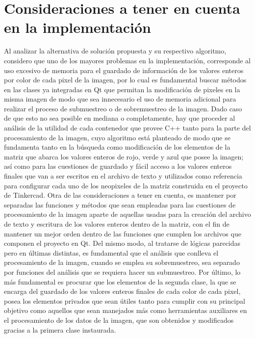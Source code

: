\documentclass{article}
\begin{document}
 \section{Consideraciones a tener en cuenta en la implementación}
 Al analizar la alternativa de solución propuesta y su respectivo algoritmo, considero que uno de los mayores problemas en la implementación, corresponde al uso excesivo de memoria para el guardado de información de los valores enteros por color de cada pixel de la imagen, por lo cual es fundamental buscar métodos en las clases ya integradas en Qt que permitan la modificación de pixeles en la misma imagen de modo que sea innecesario el uso de memoria adicional para realizar el proceso de submuestreo o de sobremuestreo de la imagen. Dado caso de que esto no sea posible en mediana o completamente, hay que proceder al análisis de la utilidad de cada contenedor que provee C++ tanto para la parte del procesamiento de la imagen, cuyo algoritmo está planteado de modo que se fundamenta tanto en la búsqueda como modificación de los elementos de la matriz que abarca los valores enteros de rojo, verde y azul que posee la imagen; así como para las cuestiones de guardado y fácil acceso a los valores enteros finales que van a ser escritos en el archivo de texto y utilizados como referencia para configurar cada uno de los neopixeles de la matriz construida en el proyecto de Tinkercad. Otra de las consideraciones a tener en cuenta, es mantener por separadas las funciones y métodos que sean empleadas para las cuestiones de procesamiento de la imagen aparte de aquellas usadas para la creación del archivo de texto y escritura de los valores enteros dentro de la matriz, con el fin de mantener un mejor orden dentro de las funciones que cumplen los archivos que componen el proyecto en Qt. Del mismo modo, al tratarse de lógicas parecidas pero en últimas distintas, es fundamental que el análisis que conlleva el procesamiento de la imagen, cuando se emplea su sobremuestreo, sea separado por funciones del análisis que se requiera hacer un submuestreo. Por último, lo más fundamental es procurar que los elementos de la segunda clase, la que se encarga del guardado de los valores enteros finales de cada color de cada pixel, posea los elementos privados que sean útiles tanto para cumplir con su principal objetivo como aquellos que sean manejados más como herramientas auxiliares en el procesamiento de los datos de la imagen, que son obtenidos y modificados gracias a la primera clase instaurada.


\end{document}
